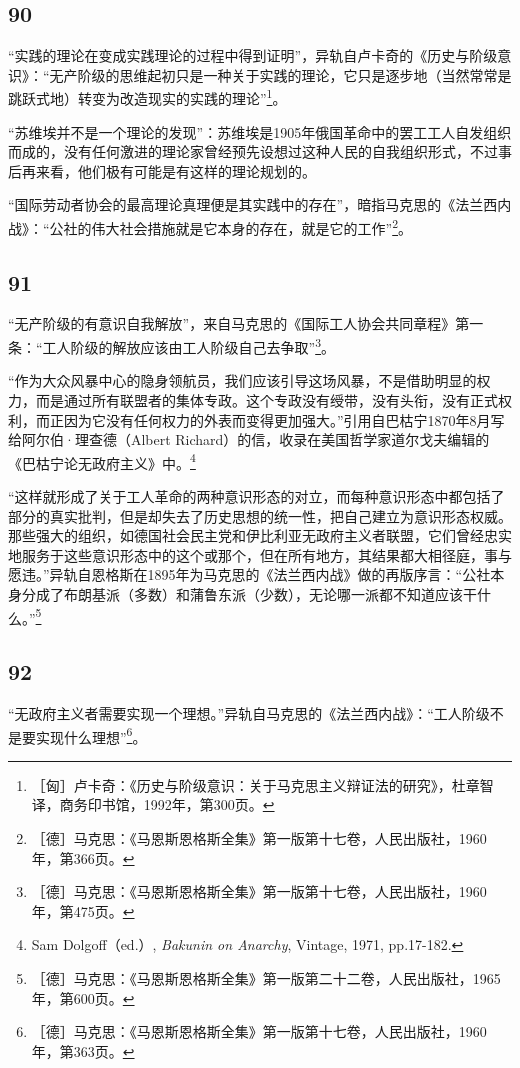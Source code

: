 \documentclass[fontset=fandol, a4paper, 12pt, openright]{ctexbook}
\begin{document}
\subsection*{90}
“实践的理论在变成实践理论的过程中得到证明”，异轨自卢卡奇的《历史与阶级意识》：“无产阶级的思维起初只是一种关于实践的理论，它只是逐步地（当然常常是跳跃式地）转变为改造现实的实践的理论”\footnote{［匈］卢卡奇：《历史与阶级意识：关于马克思主义辩证法的研究》，杜章智译，商务印书馆，1992年，第300页。}。

“苏维埃并不是一个理论的发现”：苏维埃是1905年俄国革命中的罢工工人自发组织而成的，没有任何激进的理论家曾经预先设想过这种人民的自我组织形式，不过事后再来看，他们极有可能是有这样的理论规划的。

“国际劳动者协会的最高理论真理便是其实践中的存在”，暗指马克思的《法兰西内战》：“公社的伟大社会措施就是它本身的存在，就是它的工作”\footnote{［德］马克思：《马恩斯恩格斯全集》第一版第十七卷，人民出版社，1960年，第366页。}。

\subsection*{91}
“无产阶级的有意识自我解放”，来自马克思的《国际工人协会共同章程》第一条：“工人阶级的解放应该由工人阶级自己去争取”\footnote{［德］马克思：《马恩斯恩格斯全集》第一版第十七卷，人民出版社，1960年，第475页。}。

“作为大众风暴中心的隐身领航员，我们应该引导这场风暴，不是借助明显的权力，而是通过所有联盟者的集体专政。这个专政没有绶带，没有头衔，没有正式权利，而正因为它没有任何权力的外表而变得更加强大。”引用自巴枯宁1870年8月写给阿尔伯·理查德（Albert Richard）的信，收录在美国哲学家道尔戈夫编辑的《巴枯宁论无政府主义》中。\footnote{Sam Dolgoff（ed.）, \textit{Bakunin on Anarchy}, Vintage, 1971, pp.17-182.}

“这样就形成了关于工人革命的两种意识形态的对立，而每种意识形态中都包括了部分的真实批判，但是却失去了历史思想的统一性，把自己建立为意识形态权威。那些强大的组织，如德国社会民主党和伊比利亚无政府主义者联盟，它们曾经忠实地服务于这些意识形态中的这个或那个，但在所有地方，其结果都大相径庭，事与愿违。”异轨自恩格斯在1895年为马克思的《法兰西内战》做的再版序言：“公社本身分成了布朗基派（多数）和蒲鲁东派（少数），无论哪一派都不知道应该干什么。”\footnote{［德］马克思：《马恩斯恩格斯全集》第一版第二十二卷，人民出版社，1965年，第600页。}

\subsection*{92}
“无政府主义者需要实现一个理想。”异轨自马克思的《法兰西内战》：“工人阶级不是要实现什么理想”\footnote{［德］马克思：《马恩斯恩格斯全集》第一版第十七卷，人民出版社，1960年，第363页。}。
\end{document}
